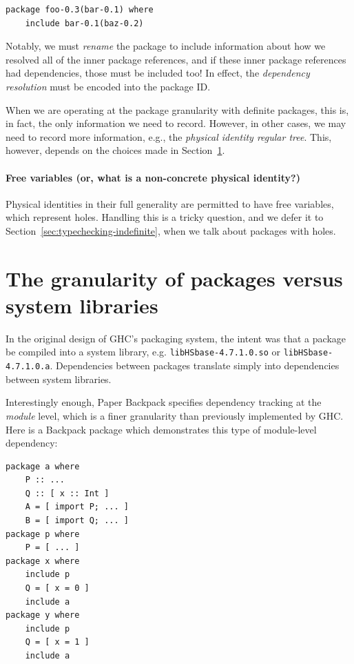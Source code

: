 \documentclass{article}
\begin{document}
\begin{verbatim}
package foo-0.3(bar-0.1) where
    include bar-0.1(baz-0.2)
\end{verbatim}

Notably, we must \emph{rename} the package to include information about
how we resolved all of the inner package references, and if these inner
package references had dependencies, those must be included too!  In
effect, the \emph{dependency resolution} must be encoded into the package ID\@.

When we are operating at the package granularity with definite packages,
this is, in fact, the only information we need to record.  However,
in other cases, we may need to record more information, e.g., the
\emph{physical identity regular tree}.  This, however, depends on the
choices made in Section~\ref{sec:flatten}.

\paragraph{Free variables (or, what is a non-concrete physical
identity?)} Physical identities in their full generality are permitted
to have free variables, which represent holes.  Handling this is a
tricky question, and we defer it to Section~\ref{sec:typechecking-indefinite}, when
we talk about packages with holes.

\section{The granularity of packages versus system libraries}\label{sec:flatten}

In the original design of GHC's packaging system, the intent was that
a package be compiled into a system library, e.g. \verb|libHSbase-4.7.1.0.so|
or \verb|libHSbase-4.7.1.0.a|.  Dependencies between packages translate simply
into dependencies between system libraries.

Interestingly enough, Paper Backpack specifies dependency tracking at
the \emph{module} level, which is a finer granularity than previously
implemented by GHC\@.  Here is a Backpack package which demonstrates
this type of module-level dependency:

\begin{verbatim}
package a where
    P :: ...
    Q :: [ x :: Int ]
    A = [ import P; ... ]
    B = [ import Q; ... ]
package p where
    P = [ ... ]
package x where
    include p
    Q = [ x = 0 ]
    include a
package y where
    include p
    Q = [ x = 1 ]
    include a
\end{verbatim}
\end{document}
